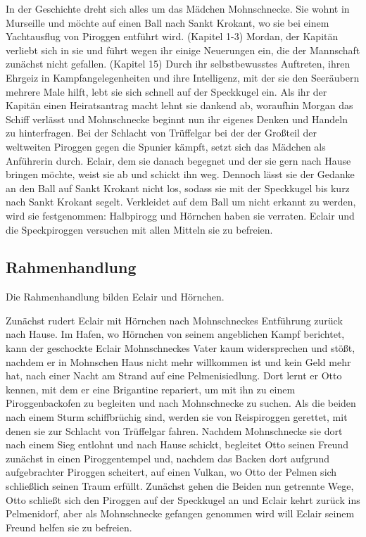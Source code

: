 In der Geschichte dreht sich alles um das Mädchen Mohnschnecke. Sie wohnt in Murseille und möchte auf einen Ball nach Sankt Krokant, wo sie bei einem Yachtausflug von Piroggen entführt wird. (Kapitel 1-3) Mordan, der Kapitän verliebt sich in sie und führt wegen ihr einige Neuerungen ein, die der Mannschaft zunächst nicht gefallen. (Kapitel 15) Durch ihr selbstbewusstes Auftreten, ihren Ehrgeiz in Kampfangelegenheiten und ihre Intelligenz, mit der sie den Seeräubern mehrere Male hilft, lebt sie sich schnell auf der Speckkugel ein. Als ihr der Kapitän einen Heiratsantrag macht lehnt sie dankend ab, woraufhin Morgan das Schiff verlässt und Mohnschnecke beginnt nun ihr eigenes Denken und Handeln zu hinterfragen. Bei der Schlacht von Trüffelgar bei der der Großteil der weltweiten Piroggen gegen die Spunier kämpft, setzt sich das Mädchen als Anführerin durch. Eclair, dem sie danach begegnet und der sie gern nach Hause bringen möchte, weist sie ab und schickt ihn weg. Dennoch lässt sie der Gedanke an den Ball auf Sankt Krokant nicht los, sodass sie mit der Speckkugel bis kurz nach Sankt Krokant segelt. Verkleidet auf dem Ball um nicht erkannt zu werden, wird sie festgenommen: Halbpirogg und Hörnchen haben sie verraten. Eclair und die Speckpiroggen versuchen mit allen Mitteln sie zu befreien.

\subsection{Rahmenhandlung}

Die Rahmenhandlung bilden Eclair und Hörnchen.

Zunächst rudert Eclair mit Hörnchen nach Mohnschneckes Entführung zurück nach Hause. Im Hafen, wo Hörnchen von seinem angeblichen Kampf berichtet, kann der geschockte Eclair Mohnschneckes Vater kaum widersprechen und stößt, nachdem er in Mohnschen Haus nicht mehr willkommen ist und kein Geld mehr hat, nach einer Nacht am Strand auf eine Pelmenisiedlung. Dort lernt er Otto kennen, mit dem er eine Brigantine repariert, um mit ihn zu einem Piroggenbackofen zu begleiten und nach Mohnschnecke zu suchen. Als die beiden nach einem Sturm schiffbrüchig sind, werden sie von Reispiroggen gerettet, mit denen sie zur Schlacht von Trüffelgar fahren. Nachdem Mohnschnecke sie dort nach einem Sieg entlohnt und nach Hause schickt, begleitet Otto seinen Freund zunächst in einen Piroggentempel und, nachdem das Backen dort aufgrund aufgebrachter Piroggen scheitert, auf einen Vulkan, wo Otto der Pelmen sich schließlich seinen Traum erfüllt. Zunächst gehen die Beiden nun getrennte Wege, Otto schließt sich den Piroggen auf der Speckkugel an und Eclair kehrt zurück ins Pelmenidorf, aber als Mohnschnecke gefangen genommen wird will Eclair seinem Freund helfen sie zu befreien.

